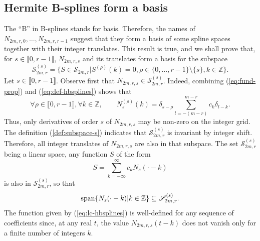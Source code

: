\subsection{Hermite B-splines form a basis}

The ``B'' in B-splines stands for basis. Therefore, the names of $N_{2m,r,0}, \ldots, N_{2m,r,r-1}$ suggest that they 
form a basis of some spline spaces together with their integer translates. This result is true, and we shall prove that, 
for $s \in \llbracket0,r-1\rrbracket$, $N_{2m,r,s}$ and its translates form a basis for the subspace
\begin{equation}\label{def:subspace-s}
  \mathscr{S}_{2m,r}^{(s)} = \{ S \in \mathscr{S}_{2m,r} | S^{(\rho)}(k) = 0, \rho \in \{0, \ldots, r-1\}\setminus 
  \{s\}, k \in \mathbb{Z}\}.
\end{equation}
Let $s \in \llbracket0,r-1\rrbracket$. Observe first that $N_{2m,r,s} \in \mathscr{S}_{2m,r}^{(s)}$. Indeed, combining 
(\ref{eq:fund-prop}) and (\ref{eq:def-hbsplines}) shows that
\begin{equation*}
  \forall \rho \in \llbracket0,r-1\rrbracket, \forall k \in \mathbb{Z}, \qquad N_s^{(\rho)}(k) = \delta_{s-\rho} 
  \sum_{l=-(m-r)}^{m-r} c_k \delta_{l-k}.
\end{equation*}
Thus, only derivatives of order $s$ of $N_{2m,r,s}$ may be non-zero on the integer grid. The definition 
(\ref{def:subspace-s}) indicates that $\mathscr{S}_{2m,r}^{(s)}$ is invariant by integer shift. Therefore, all integer 
translates of $N_{2m,r,s}$ are also in that subspace. The set $\mathscr{S}_{2m,r}^{(s)}$ being a linear space, any 
function $S$ of the form
\begin{equation}\label{eq:lc-hbsplines}
  S = \sum_{k=-\infty}^{\infty} c_{k} N_s(\cdot-k)
\end{equation}
is also in $\mathscr{S}_{2m,r}^{(s)}$, so that
\begin{equation*}
  \operatorname*{span} \{N_s(\cdot-k) | k \in \mathbb{Z} \} \subseteq \mathscr{S}_{2m,r}^{(s)}.
\end{equation*}
The function given by (\ref{eq:lc-hbsplines}) is well-defined for any sequence of coefficients since, at any real $t$,
the value $N_{2m,r,s}(t-k)$ does not vanish only for a finite number of integers $k$.  \\

